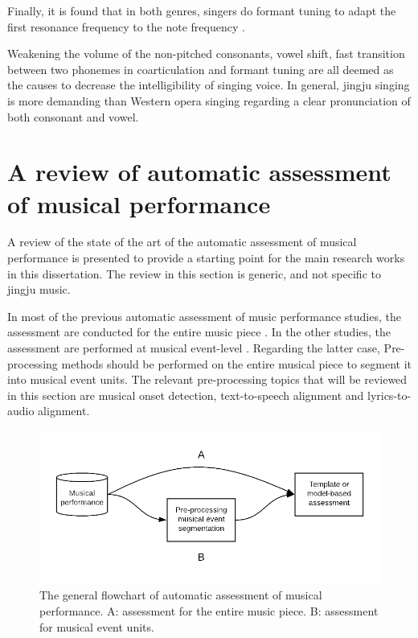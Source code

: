 Finally, it is found that in both genres, singers do formant tuning to adapt the first resonance frequency to the note frequency \cite{Sundberg2013}.

Weakening the volume of the non-pitched consonants, vowel shift, fast transition between two phonemes in coarticulation and formant tuning are all deemed as the causes to decrease the intelligibility of singing voice. In general, jingju singing is more demanding than Western opera singing regarding a clear pronunciation of both consonant and vowel. 

\section{A review of automatic assessment of musical performance}

A review of the state of the art of the automatic assessment of musical performance is presented to provide a starting point for the main research works in this dissertation. The review in this section is generic, and not specific to jingju music.

In most of the previous automatic assessment of music performance studies, the assessment are conducted for the entire music piece . In the other studies, the assessment are performed at musical event-level . Regarding the latter case, Pre-processing methods should be performed on the entire musical piece to segment it into musical event units. The relevant pre-processing topics that will be reviewed in this section are musical onset detection, text-to-speech alignment and lyrics-to-audio alignment. 

\begin{figure}[ht!]
\includegraphics[width=\textwidth]{figs/blockDiags_rong/ch2_assessment.png}
\caption{The general flowchart of automatic assessment of musical performance. A: assessment for the entire music piece. B: assessment for musical event units.}
\label{fig:ch2_assessment}
\end{figure}


